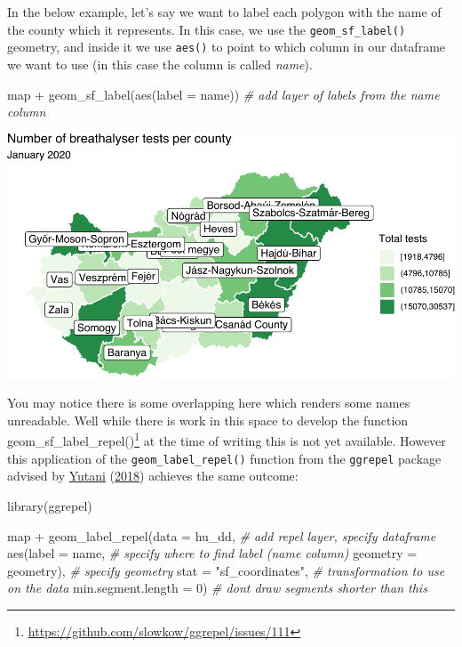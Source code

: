 \documentclass[
  krantz2]{krantz}
\makeatletter
\newenvironment{Shaded}{\begin{snugshade}}{\end{snugshade}}
\newcommand{\AttributeTok}[1]{\textcolor[rgb]{0.61,0.61,0.61}{#1}}
\newcommand{\CommentTok}[1]{\textcolor[rgb]{0.37,0.37,0.37}{\textit{#1}}}
\newcommand{\DecValTok}[1]{\textcolor[rgb]{0.06,0.06,0.06}{#1}}
\newcommand{\FunctionTok}[1]{\textcolor[rgb]{0,0,0}{#1}}
\newcommand{\NormalTok}[1]{#1}
\newcommand{\SpecialCharTok}[1]{\textcolor[rgb]{0,0,0}{#1}}
\newcommand{\StringTok}[1]{\textcolor[rgb]{0.5,0.5,0.5}{#1}}
\renewcommand{\href}[2]{#2\footnote{\url{#1}}}
\newenvironment{kframe}{%
\medskip{}
\setlength{\fboxsep}{.8em}
 \def\at@end@of@kframe{}%
 \ifinner\ifhmode%
  \def\at@end@of@kframe{\end{minipage}}%
  \begin{minipage}{\columnwidth}%
 \fi\fi%
 \def\FrameCommand##1{\hskip\@totalleftmargin \hskip-\fboxsep
 \colorbox{shadecolor}{##1}\hskip-\fboxsep
     \hskip-\linewidth \hskip-\@totalleftmargin \hskip\columnwidth}%
 \MakeFramed {\advance\hsize-\width
   \@totalleftmargin\z@ \linewidth\hsize
   \@setminipage}}%
 {\par\unskip\endMakeFramed%
 \at@end@of@kframe}
\renewenvironment{Shaded}{\begin{kframe}}{\end{kframe}}
\makeatother
\begin{document}
In the below example, let's say we want to label each polygon with the name of the county which it represents. In this case, we use the \texttt{geom\_sf\_label()} geometry, and inside it we use \texttt{aes()} to point to which column in our dataframe we want to use (in this case the column is called \emph{name}).

\begin{Shaded}
\begin{Highlighting}[]
\NormalTok{map  }\SpecialCharTok{+} 
  \FunctionTok{geom\_sf\_label}\NormalTok{(}\FunctionTok{aes}\NormalTok{(}\AttributeTok{label =}\NormalTok{ name))  }\CommentTok{\# add layer of labels from the name column}
\end{Highlighting}
\end{Shaded}

\includegraphics{crime_mapping_files/figure-latex/addcountynames-1.pdf}

You may notice there is some overlapping here which renders some names unreadable. Well while \href{https://github.com/slowkow/ggrepel/issues/111}{there is work in this space to develop the function geom\_sf\_label\_repel()} at the time of writing this is not yet available. However this application of the \texttt{geom\_label\_repel()} function from the \texttt{ggrepel} package advised by \protect\hyperlink{ref-Yutani_2018}{Yutani} (\protect\hyperlink{ref-Yutani_2018}{2018}) achieves the same outcome:

\begin{Shaded}
\begin{Highlighting}[]
\FunctionTok{library}\NormalTok{(ggrepel)}

\NormalTok{map }\SpecialCharTok{+} 
  \FunctionTok{geom\_label\_repel}\NormalTok{(}\AttributeTok{data =}\NormalTok{ hu\_dd,       }\CommentTok{\# add repel layer, specify dataframe}
                   \FunctionTok{aes}\NormalTok{(}\AttributeTok{label =}\NormalTok{ name,   }\CommentTok{\# specify where to find label (name column)}
                       \AttributeTok{geometry =}\NormalTok{ geometry),  }\CommentTok{\# specify geometry}
                   \AttributeTok{stat =} \StringTok{"sf\_coordinates"}\NormalTok{,  }\CommentTok{\# transformation to use on the data}
                   \AttributeTok{min.segment.length =} \DecValTok{0}\NormalTok{) }\CommentTok{\# don\textquotesingle{}t draw segments shorter than this}
\end{Highlighting}
\end{Shaded}
\end{document}
